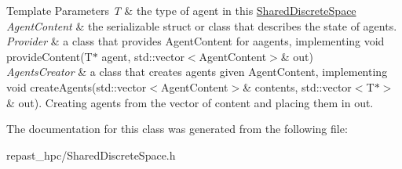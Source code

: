 \begin{DoxyTemplParams}{Template Parameters}
{\em T} & the type of agent in this \hyperlink{classrepast_1_1_shared_discrete_space}{Shared\-Discrete\-Space} \\
\hline
{\em Agent\-Content} & the serializable struct or class that describes the state of agents. \\
\hline
{\em Provider} & a class that provides Agent\-Content for aagents, implementing void provide\-Content(\-T$\ast$ agent, std\-::vector$<$\-Agent\-Content$>$\& out) \\
\hline
{\em Agents\-Creator} & a class that creates agents given Agent\-Content, implementing void create\-Agents(std\-::vector$<$\-Agent\-Content$>$\& contents, std\-::vector$<$\-T$\ast$$>$\& out). Creating agents from the vector of content and placing them in out. \\
\hline
\end{DoxyTemplParams}


The documentation for this class was generated from the following file\-:\begin{DoxyCompactItemize}
\item 
repast\-\_\-hpc/Shared\-Discrete\-Space.\-h\end{DoxyCompactItemize}
